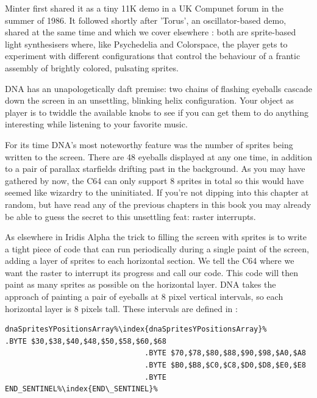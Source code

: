 Minter first shared it as a tiny 11K demo in a UK Compunet forum in the summer of 
1986. It followed shortly after 'Torus', an oscillator-based demo, shared at the same time and which we
cover elsewhere : both are sprite-based
light synthesisers where, like Psychedelia and Colorspace, the player gets to experiment with different
configurations that control the behaviour of a frantic assembly of brightly colored, pulsating sprites.

DNA has an unapologetically daft premise: two chains of flashing eyeballs cascade down the
screen in an unsettling, blinking helix configuration. Your object as player is to twiddle the available
knobs to see if you can get them to do anything interesting while listening to your favorite music.

For its time DNA's most noteworthy feature was the number of sprites being written to the screen. There are
48 eyeballs displayed at any one time, in addition to a pair of parallax starfields drifting past in the
background. As you may have gathered by now, the C64 can only support 8 sprites in total so this would
have seemed like wizardry to the uninitiated. If you're not dipping into this chapter at random, but have
read any of the previous chapters in this book you may already be able to guess the secret to this 
unsettling feat: raster interrupts.

As elsewhere in Iridis Alpha the trick to filling the screen with sprites is to write a tight piece of code
that can run periodically during a single paint of the screen, adding a layer of sprites to each horizontal
section. We tell the C64 where we want the raster to interrupt its progress and call our code. This code
will then paint as many sprites as possible on the horizontal layer. DNA takes the approach of painting a
pair of eyeballs at 8 pixel vertical intervals, so each horizontal layer is 8 pixels tall. 
These intervals are defined in :

\begin{lstlisting}[escapechar=\%]
dnaSpritesYPositionsArray%\index{dnaSpritesYPositionsArray}%       .BYTE $30,$38,$40,$48,$50,$58,$60,$68
                                .BYTE $70,$78,$80,$88,$90,$98,$A0,$A8
                                .BYTE $B0,$B8,$C0,$C8,$D0,$D8,$E0,$E8
                                .BYTE END_SENTINEL%\index{END\_SENTINEL}%
\end{lstlisting}

